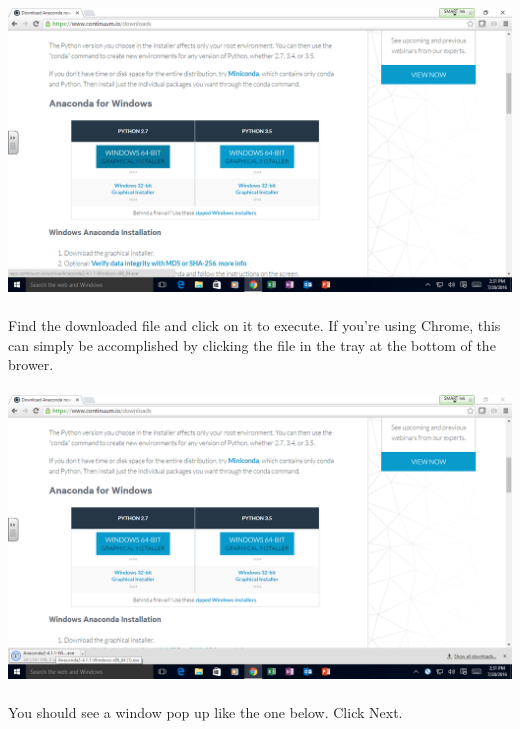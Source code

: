 \documentclass[]{article}
\begin{document}
\paragraph{}
\begin{centering}
    \centerline{\includegraphics[scale=0.35]{Screenshot_3.png}}
\end{centering}

\paragraph{}
Find the downloaded file and click on it to execute. If you're using Chrome, this can simply be accomplished by clicking the file in the tray at the bottom of the brower.
\paragraph{}
\begin{centering}
    \centerline{\includegraphics[scale=0.35]{Screenshot_4.png}}
\end{centering}

\paragraph{}
You should see a window pop up like the one below. Click Next.
\end{document}
